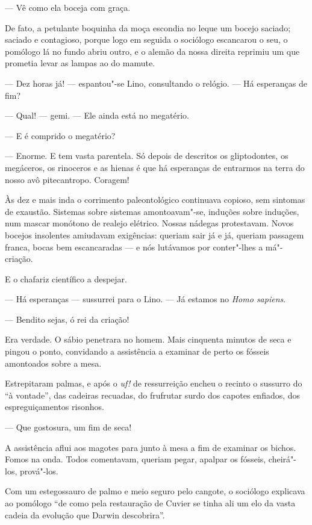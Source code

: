 --- Vê como ela boceja com graça.

De fato, a petulante boquinha da moça escondia no leque um bocejo
saciado; saciado e contagioso, porque logo em seguida o sociólogo
escancarou o seu, o pomólogo lá no fundo abriu outro, e o alemão da
nossa direita reprimiu um que prometia levar as lampas ao do mamute.

--- Dez horas já! --- espantou"-se Lino, consultando o relógio. --- Há
esperanças de fim?

--- Qual! --- gemi. --- Ele ainda está no megatério.

--- E é comprido o megatério?

--- Enorme. E tem vasta parentela. Só depois de descritos os
gliptodontes, os megáceros, os rinoceros e as hienas é que há esperanças
de entrarmos na terra do nosso avô pitecantropo. Coragem!

Às dez e mais inda o corrimento paleontológico continuava copioso, sem
sintomas de exaustão. Sistemas sobre sistemas amontoavam"-se, induções
sobre induções, num mascar monótono de realejo elétrico. Nossas nádegas
protestavam. Novos bocejos insolentes amiudavam exigências: queriam sair
já e já, queriam passagem franca, bocas bem escancaradas --- e nós
lutávamos por conter"-lhes a má"-criação.

E o chafariz científico a despejar.

--- Há esperanças --- sussurrei para o Lino. --- Já estamos no
\emph{Homo sapiens}.

--- Bendito sejas, ó rei da criação!

Era verdade. O sábio penetrara no homem. Mais cinquenta minutos de seca
e pingou o ponto, convidando a assistência a examinar de perto os
fósseis amontoados sobre a mesa.

Estrepitaram palmas, e após o \emph{uf!} de ressurreição encheu o
recinto o sussurro do ``à vontade'', das cadeiras recuadas, do frufrutar
surdo dos capotes enfiados, dos espreguiçamentos risonhos.

--- Que gostosura, um fim de seca!

A assistência aflui aos magotes para junto à mesa a fim de examinar os
bichos. Fomos na onda. Todos comentavam, queriam pegar, apalpar os
fósseis, cheirá"-los, prová"-los.

Com um estegossauro de palmo e meio seguro pelo cangote, o sociólogo
explicava ao pomólogo ``de como pela restauração de Cuvier se tinha ali
um elo da vasta cadeia da evolução que Darwin descobrira''.

